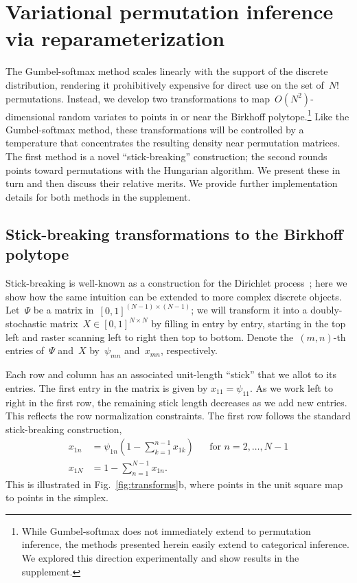 \documentclass[twoside]{article}
\begin{document}
\section{Variational permutation inference via reparameterization}
\label{sec:permutation}
The Gumbel-softmax method scales linearly with the support of the
discrete distribution, rendering it prohibitively expensive for direct
use on the set of~$N!$ permutations.  Instead, we develop two
transformations to map~$O(N^2)$-dimensional random variates to points
in or near the Birkhoff polytope.\footnote{While Gumbel-softmax does
  not immediately extend to permutation inference, the methods
  presented herein easily extend to categorical inference.  We
  explored this direction experimentally and show results in the
  supplement.}  Like the Gumbel-softmax method, these transformations
will be controlled by a temperature that concentrates the resulting
density near permutation matrices.  The first method is a novel
``stick-breaking'' construction; the second rounds points toward
permutations with the Hungarian algorithm.  We present these in turn
and then discuss their relative merits. We provide further
implementation details for both methods in the supplement.

\subsection{Stick-breaking transformations to the Birkhoff polytope}
Stick-breaking is well-known as a construction for the Dirichlet
process~\citep{sethuraman1994constructive}; here we show how the
same intuition can be extended to more complex discrete objects. 
Let~$\Psi$ be a matrix in~${[0,1]^{(N-1) \times (N-1)}}$; we will
transform it into a doubly-stochastic
matrix~${X \in [0,1]^{N \times N}}$ by filling in entry by entry, starting
in the top left and raster scanning left to right then top to
bottom. Denote the~$(m,n)$-th entries of~$\Psi$ and~$X$ by~$\psi_{mn}$
and~${x}_{mn}$, respectively.

Each row and column has an associated unit-length ``stick'' that we
allot to its entries.  The first entry in the matrix is given by
$x_{11} = \psi_{11}$.  As we work left to right in the first row, the
remaining stick length decreases as we add new entries. This reflects
the row normalization constraints.  The first row follows the standard
stick-breaking construction,
\begin{align*}
  x_{1n} &= \psi_{1n} \left(1 - \sum_{k=1}^{n-1} x_{1k} \right)  & &  \text{for } n=2, \ldots, N-1\\
  x_{1N} &= 1 - \sum_{n=1}^{N-1} x_{1n}.
\end{align*}
This is illustrated in Fig.~\ref{fig:transforms}b, where points
in the unit square map to points in the simplex. 
\end{document}
